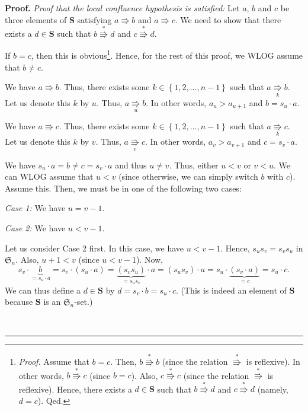 \documentclass[numbers=enddot,12pt,final,onecolumn,notitlepage]{scrartcl}%
\theoremstyle{definition}
\newenvironment{proof}[1][Proof]{\noindent\textbf{#1.} }{\ \rule{0.5em}{0.5em}}
\newenvironment{verlong}{}{}
\begin{document}
\begin{proof}
\begin{verlong}
\textit{Proof that the local confluence hypothesis is satisfied:} Let $a$, $b$
and $c$ be three elements of $\mathbf{S}$ satisfying $a\Rrightarrow b$ and
$a\Rrightarrow c$. We need to show that there exists a $d\in\mathbf{S}$ such
that $b\overset{\ast}{\Rrightarrow}d$ and $c\overset{\ast}{\Rrightarrow}d$.

If $b=c$, then this is obvious\footnote{\textit{Proof.} Assume that $b=c$.
Then, $b\overset{\ast}{\Rrightarrow}b$ (since the relation $\overset{\ast
}{\Rrightarrow}$ is reflexive). In other words, $b\overset{\ast}{\Rrightarrow
}c$ (since $b=c$). Also, $c\overset{\ast}{\Rrightarrow}c$ (since the relation
$\overset{\ast}{\Rrightarrow}$ is reflexive). Hence, there exists a
$d\in\mathbf{S}$ such that $b\overset{\ast}{\Rrightarrow}d$ and
$c\overset{\ast}{\Rrightarrow}d$ (namely, $d=c$). Qed.}. Hence, for the rest
of this proof, we WLOG assume that $b\neq c$.

We have $a\Rrightarrow b$. Thus, there exists some $k\in\left\{
1,2,\ldots,n-1\right\}  $ such that $a\underset{k}{\Rrightarrow}b$. Let us
denote this $k$ by $u$. Thus, $a\underset{u}{\Rrightarrow}b$. In other words,
$a_{u}>a_{u+1}$ and $b=s_{u}\cdot a$.

We have $a\Rrightarrow c$. Thus, there exists some $k\in\left\{
1,2,\ldots,n-1\right\}  $ such that $a\underset{k}{\Rrightarrow}c$. Let us
denote this $k$ by $v$. Thus, $a\underset{v}{\Rrightarrow}c$. In other words,
$a_{v}>a_{v+1}$ and $c=s_{v}\cdot a$.

We have $s_{u}\cdot a=b\neq c=s_{v}\cdot a$ and thus $u\neq v$. Thus, either
$u<v$ or $v<u$. We can WLOG assume that $u<v$ (since otherwise, we can simply
switch $b$ with $c$). Assume this. Then, we must be in one of the following
two cases:

\textit{Case 1:} We have $u=v-1$.

\textit{Case 2:} We have $u<v-1$.

Let us consider Case 2 first. In this case, we have $u<v-1$. Hence,
$s_{u}s_{v}=s_{v}s_{u}$ in $\mathfrak{S}_{n}$. Also, $u+1<v$ (since $u<v-1$).
Now,%
\[
s_{v}\cdot\underbrace{b}_{=s_{u}\cdot a}=s_{v}\cdot\left(  s_{u}\cdot
a\right)  =\underbrace{\left(  s_{v}s_{u}\right)  }_{=s_{u}s_{v}}\cdot
a=\left(  s_{u}s_{v}\right)  \cdot a=s_{u}\cdot\underbrace{\left(  s_{v}\cdot
a\right)  }_{=c}=s_{u}\cdot c.
\]
We can thus define a $d\in\mathbf{S}$ by $d=s_{v}\cdot b=s_{u}\cdot c$. (This
is indeed an element of $\mathbf{S}$ because $\mathbf{S}$ is an $\mathfrak{S}%
_{n}$-set.)


\end{verlong}
\end{proof}
\end{document}
